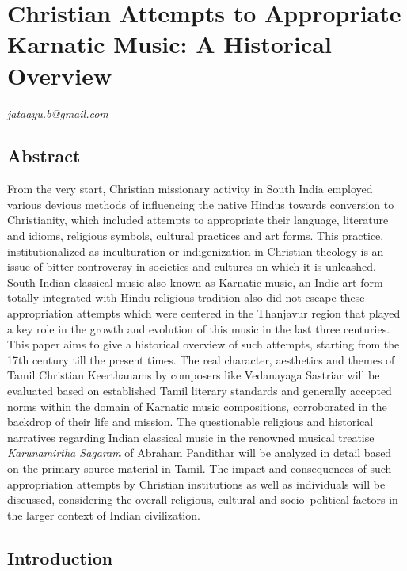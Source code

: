 
\chapter{Christian Attempts to Appropriate Karnatic Music: A Historical Overview}\label{chapter5}


\begin{flushright}
\textit{jataayu.b@gmail.com}
\end{flushright}


\section*{Abstract}

From the very start, Christian missionary activity in South India employed various devious methods of influencing the native Hindus towards conversion to Christianity, which included attempts to appropriate their language, literature and idioms, religious symbols, cultural practices and art forms. This practice, institutionalized as inculturation or indigenization in Christian theology is an issue of bitter controversy in societies and cultures on which it is unleashed. South Indian classical music also known as Karnatic music, an Indic art form totally integrated with Hindu religious tradition also did not escape these appropriation attempts which were centered in the Thanjavur region that played a key role in the growth and evolution of this music in the last three centuries. This paper aims to give a historical overview of such attempts, starting from the 17th century till the present times. The real character, aesthetics and themes of Tamil Christian Keerthanams by composers like Vedanayaga Sastriar will be evaluated based on established Tamil literary standards and generally accepted norms within the domain of Karnatic music compositions, corroborated in the backdrop of their life and mission. The questionable religious and historical narratives regarding Indian classical music in the renowned musical treatise \textit{Karunamirtha Sagaram} of Abraham Pandithar will be analyzed in detail based on the primary source material in Tamil. The impact and consequences of such appropriation attempts by Christian institutions as well as individuals will be discussed, considering the overall religious, cultural and socio–political factors in the larger context of Indian civilization.


\section*{Introduction}

